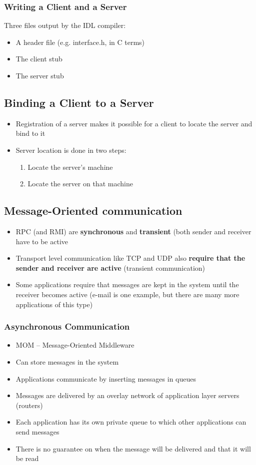 \subsubsection{Writing a Client and a Server}
Three files output by the IDL compiler:
\begin{itemize}
	\item A header file (e.g. interface.h, in C terms)
	\item The client stub
	\item The server stub	
\end{itemize}

\subsection{Binding a Client to a Server}
\begin{itemize}
	\item Registration of a server makes it possible for a client to locate the server and bind to it
	\item Server location is done in two steps:
	\begin{enumerate}
		\item Locate the server's machine
		\item Locate the server on that machine
	\end{enumerate}	
\end{itemize}

\subsection{Message-Oriented communication}
\begin{itemize}
	\item RPC (and RMI) are \textbf{synchronous} and \textbf{transient} (both sender and receiver have to be active
	\item Transport level communication like TCP and UDP also \textbf{require that the sender and receiver are active} (transient communication)
	\item Some applications require that messages are kept in the system until the receiver becomes active (e-mail is one example, but there are many more applications of this type)	
\end{itemize}
\subsubsection{Asynchronous Communication}
\begin{itemize}
	\item MOM -- Message-Oriented Middleware
	\item Can store messages in the system
	\item Applications communicate by inserting messages in queues
	\item Messages are delivered by an overlay network of application layer servers (routers)
	\item Each application has its own private queue to which other applications can send messages
	\item There is no guarantee on when the message will be delivered and that it will be read	
\end{itemize}

